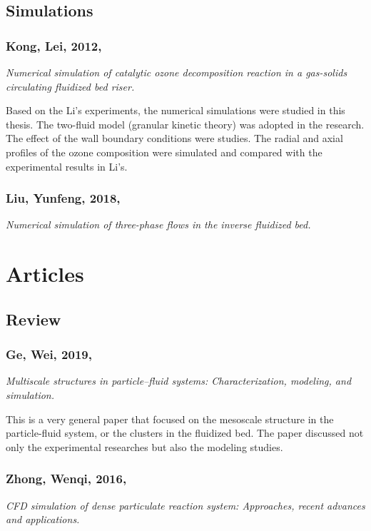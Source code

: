 \documentclass[12pt]{report}
\begin{document}
\section{Simulations}
%
%
\subsection[Kong, Lei, 2012]{Kong, Lei, 2012, \cite{konglei2012}}
\textit{Numerical simulation of catalytic ozone decomposition reaction in a gas-solids circulating fluidized bed riser.}

Based on the Li's experiments, the numerical simulations were studied in this thesis. 
The two-fluid model (granular kinetic theory) was adopted in the research. 
The effect of the wall boundary conditions were studies. 
The radial and axial profiles of the ozone composition were simulated and compared with the experimental results in Li's.

%
%
\subsection[Liu, Yunfeng, 2018]{Liu, Yunfeng, 2018, \cite{liuyf2018}}
\textit{Numerical simulation of three-phase flows in the inverse fluidized bed.}

\chapter{Articles}
\section{Review}
%
%
\subsection[Ge, Wei, 2019]{Ge, Wei, 2019, \cite{ge2019multiscale}}
\textit{Multiscale structures in particle--fluid systems: Characterization, modeling, and simulation.}

This is a very general paper that focused on the mesoscale structure in the particle-fluid system, or the clusters in the fluidized bed. 
The paper discussed not only the experimental researches but also the modeling studies. 
%
%
\subsection[Zhong, Wenqi, 2016]{Zhong, Wenqi, 2016, \cite{zhong2016cfd}}
\textit{CFD simulation of dense particulate reaction system: Approaches, recent advances and applications.}
\end{document}
